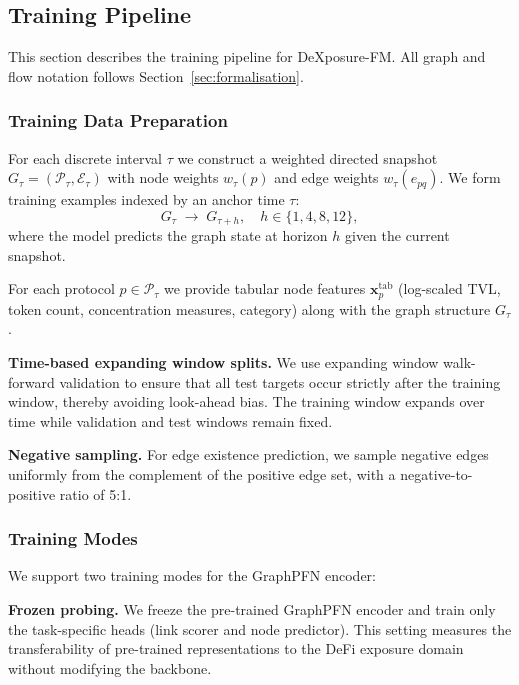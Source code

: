 \subsection{Training Pipeline}
\label{sec:training}

This section describes the training pipeline for DeXposure-FM. All graph and flow notation follows Section~\ref{sec:formalisation}.

\subsubsection{Training Data Preparation}

For each discrete interval $\tau$ we construct a weighted directed snapshot $G_{\tau}=(\mathcal P_{\tau},\mathcal E_{\tau})$ with node weights $w_{\tau}(p)$ and edge weights $w_{\tau}(e_{pq})$. We form training examples indexed by an anchor time $\tau$:
\begin{equation}
G_{\tau} \;\longrightarrow\; G_{\tau+h}, \quad h \in \{1, 4, 8, 12\},
\end{equation}
where the model predicts the graph state at horizon $h$ given the current snapshot.

For each protocol $p\in\mathcal P_{\tau}$ we provide tabular node features $\mathbf x^{\mathrm{tab}}_{p}$ (log-scaled TVL, token count, concentration measures, category) along with the graph structure $G_{\tau}$.

\textbf{Time-based expanding window splits.}
We use expanding window walk-forward validation to ensure that all test targets occur strictly after the training window, thereby avoiding look-ahead bias. The training window expands over time while validation and test windows remain fixed.

\textbf{Negative sampling.}
For edge existence prediction, we sample negative edges uniformly from the complement of the positive edge set, with a negative-to-positive ratio of 5:1.

\subsubsection{Training Modes}

We support two training modes for the GraphPFN encoder:

\textbf{Frozen probing.}
We freeze the pre-trained GraphPFN encoder and train only the task-specific heads (link scorer and node predictor). This setting measures the transferability of pre-trained representations to the DeFi exposure domain without modifying the backbone.

